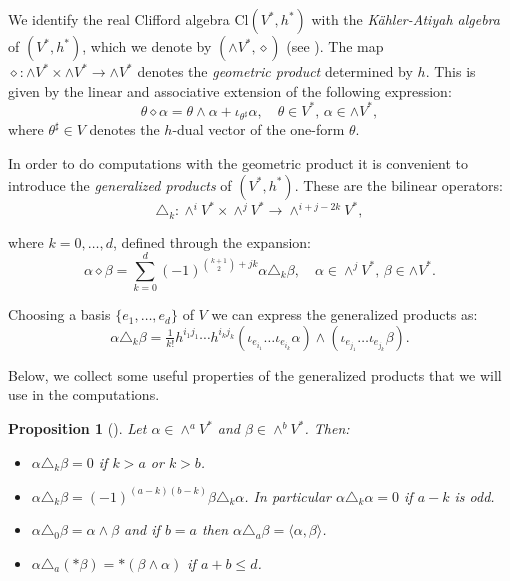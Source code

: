 \documentclass[10pt,a4paper,twoside,reqno]{amsart}
\theoremstyle{plain}
\newtheorem{prop}[thm]{Proposition}
\theoremstyle{definition}
\theoremstyle{remark}
\newcommand{\escal}[1]{\langle#1\rangle}
\begin{document}
We identify the real Clifford algebra $\mathrm{Cl}(V^*,h^*)$ with the \emph{Kähler-Atiyah algebra} of $(V^*,h^*)$, which we denote by $(\wedge V^*,\diamond)$ (see \cite{Chev54,Chev55}). The map $\diamond\colon\wedge V^*\times\wedge V^*\to\wedge V^*$ denotes the \emph{geometric product} determined by $h$. This is given by the linear and associative extension of the following expression: $$\theta\diamond\alpha=\theta\wedge\alpha+\iota_{\theta^\sharp}\alpha,\quad\theta\in V^*,\,\alpha\in\wedge V^*,$$ where $\theta^\sharp\in V$ denotes the $h$-dual vector of the one-form $\theta$.\medskip

In order to do computations with the geometric product it is convenient to introduce the \emph{generalized products} of $(V^*,h^*)$. These are the bilinear operators:
\begin{equation}
\label{eq:bilinearDelta}
\triangle_k\colon\wedge^i V^*\times\wedge^j V^*\to\wedge^{i + j - 2k}V^*,
\end{equation}

\noindent
where $k=0,\ldots,d$, defined through the expansion: 
\begin{equation*}
\alpha\diamond\beta=\sum_{k=0}^d(-1)^{\binom{k+1}{2}+jk}\alpha\triangle_k\beta,\quad\alpha\in\wedge^j V^*,\,\beta\in\wedge V^*.
\end{equation*}

\noindent
Choosing a basis $\{e_1,\ldots,e_d\}$ of $V$ we can express the generalized products as: 
\begin{equation*}
    \alpha\triangle_k\beta=\tfrac{1}{k!}h^{i_1j_1}\cdots h^{i_kj_k}(\iota_{e_{i_1}}\ldots\iota_{e_{i_k}}\alpha)\wedge(\iota_{e_{j_1}}\ldots\iota_{e_{j_k}}\beta).
\end{equation*}

\noindent
Below, we collect some useful properties of the generalized products that we will use in the computations.

\begin{prop}[{\cite{LB13,LBC13,LBC16}}]\label{prop:appendix_properties}
    Let $\alpha\in\wedge^aV^*$ and $\beta\in\wedge^bV^*$. Then: \begin{itemize}
        \item $\alpha\triangle_k\beta=0$ if $k>a$ or $k>b$.
        \item $\alpha\triangle_k\beta=(-1)^{(a-k)(b-k)}\beta\triangle_k\alpha$. In particular $\alpha\triangle_k\alpha=0$ if $a-k$ is odd.
        \item $\alpha\triangle_0\beta=\alpha\wedge\beta$ and if $b=a$ then $\alpha\triangle_a\beta=\escal{\alpha,\beta}$.
        \item $\alpha\triangle_a(*\beta)=*(\beta\wedge\alpha)$ if $a+b\leq d$.
    \end{itemize}
\end{prop}
\end{document}
